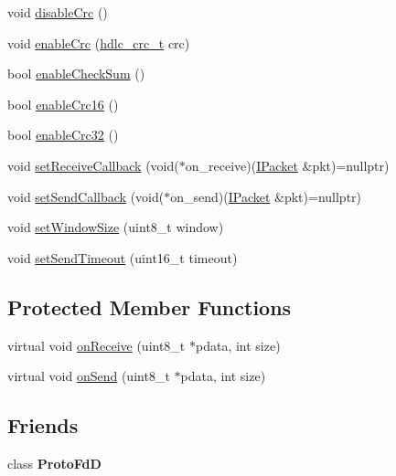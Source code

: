 \begin{DoxyCompactItemize}
void \hyperlink{classTiny_1_1IProtoFd_af41446f47a7c520ff8f9683e6ae45614}{disable\+Crc} ()
\item 
void \hyperlink{classTiny_1_1IProtoFd_a7dec2906051505034e91b503318a5563}{enable\+Crc} (\hyperlink{group__HDLC__API_gabb73b32d08d8e79eefe9385634a74bf7}{hdlc\+\_\+crc\+\_\+t} crc)
\item 
bool \hyperlink{classTiny_1_1IProtoFd_a0f43402e86ea64f5c0154477d84b0c7c}{enable\+Check\+Sum} ()
\item 
bool \hyperlink{classTiny_1_1IProtoFd_a8b57afdb66434aa35409af34b04e1db9}{enable\+Crc16} ()
\item 
bool \hyperlink{classTiny_1_1IProtoFd_a1bf1f5211ae3a49caf73ee3de3bb9247}{enable\+Crc32} ()
\item 
void \hyperlink{classTiny_1_1IProtoFd_a70aa7c85b5fe83513eebb63b803d5825}{set\+Receive\+Callback} (void($\ast$on\+\_\+receive)(\hyperlink{classTiny_1_1IPacket}{I\+Packet} \&pkt)=nullptr)
\item 
void \hyperlink{classTiny_1_1IProtoFd_ac3c8efc9a30ab547c5d575a8de0ef1e5}{set\+Send\+Callback} (void($\ast$on\+\_\+send)(\hyperlink{classTiny_1_1IPacket}{I\+Packet} \&pkt)=nullptr)
\item 
void \hyperlink{classTiny_1_1IProtoFd_adddcc24bf1ef40d39c944679a97c1ec4}{set\+Window\+Size} (uint8\+\_\+t window)
\item 
void \hyperlink{classTiny_1_1IProtoFd_a2492655abda41d5b0fbda6f0e1c6badc}{set\+Send\+Timeout} (uint16\+\_\+t timeout)
\end{DoxyCompactItemize}
\subsection*{Protected Member Functions}
\begin{DoxyCompactItemize}
\item 
virtual void \hyperlink{classTiny_1_1IProtoFd_a795b41c969708964cd4646580af1c3ab}{on\+Receive} (uint8\+\_\+t $\ast$pdata, int size)
\item 
virtual void \hyperlink{classTiny_1_1IProtoFd_acd324920c1f35d378fb5153b51cd6561}{on\+Send} (uint8\+\_\+t $\ast$pdata, int size)
\end{DoxyCompactItemize}
\subsection*{Friends}
\begin{DoxyCompactItemize}
\item 
\mbox{\label{classTiny_1_1IProtoFd_ac4b680549c66e93cb1996fadcf86d724}} 
class {\bfseries Proto\+FdD}
\end{DoxyCompactItemize}


